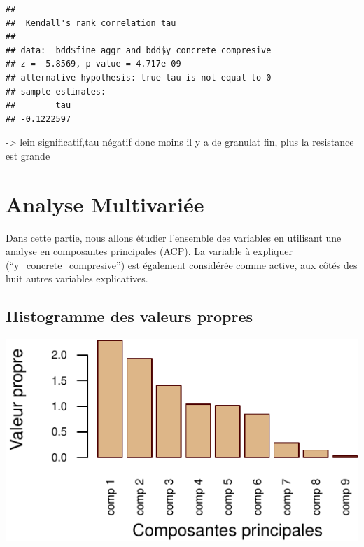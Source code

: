 \documentclass[
  12pt,
]{article}
\newenvironment{Shaded}{\begin{snugshade}}{\end{snugshade}}
\newcommand{\AttributeTok}[1]{\textcolor[rgb]{0.13,0.29,0.53}{#1}}
\newcommand{\FunctionTok}[1]{\textcolor[rgb]{0.13,0.29,0.53}{\textbf{#1}}}
\newcommand{\NormalTok}[1]{#1}
\newcommand{\SpecialCharTok}[1]{\textcolor[rgb]{0.81,0.36,0.00}{\textbf{#1}}}
\newcommand{\StringTok}[1]{\textcolor[rgb]{0.31,0.60,0.02}{#1}}
\begin{document}
\begin{Shaded}
\end{Shaded}

\begin{verbatim}
## 
##  Kendall's rank correlation tau
## 
## data:  bdd$fine_aggr and bdd$y_concrete_compresive
## z = -5.8569, p-value = 4.717e-09
## alternative hypothesis: true tau is not equal to 0
## sample estimates:
##        tau 
## -0.1222597
\end{verbatim}

-\textgreater{} lein significatif,tau négatif donc moins il y a de
granulat fin, plus la resistance est grande

\section{Analyse Multivariée}\label{analyse-multivariuxe9e}

Dans cette partie, nous allons étudier l'ensemble des variables en
utilisant une analyse en composantes principales (ACP). La variable à
expliquer (``y\_concrete\_compresive'') est également considérée comme
active, aux côtés des huit autres variables explicatives.

\subsection{Histogramme des valeurs
propres}\label{histogramme-des-valeurs-propres}

\begin{center}\includegraphics{rmd_final_files/figure-latex/unnamed-chunk-17-1} \end{center}
\end{document}
